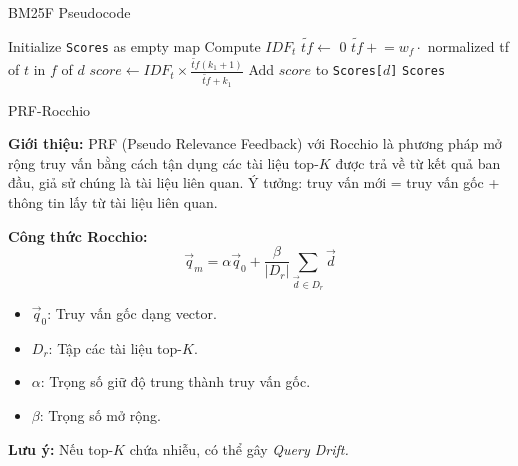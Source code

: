 \documentclass[10pt,aspectratio=169]{beamer}
\begin{document}
\begin{frame}{BM25F Pseudocode}
\scriptsize
\begin{tcolorbox}[colback=lightblue,colframe=ptitblue,boxrule=0.4pt,title=BM25F Algorithm (Pseudocode)]
\vspace{-1em}
\begin{algorithm}[H]
\begin{algorithmic}[1]
\State Initialize \texttt{Scores} as empty map
        \State Compute $IDF_t$
            \State $\tilde{tf} \leftarrow$ 0
                \State $\tilde{tf} \mathrel{+}= w_f \cdot$ normalized tf of $t$ in $f$ of $d$
            \EndFor
            \State $score \leftarrow IDF_t \times \frac{\tilde{tf} (k_1+1)}{\tilde{tf} + k_1}$
            \State Add $score$ to \texttt{Scores[$d$]}
        \EndFor
    \EndIf
\EndFor
\State \Return \texttt{Scores}
\end{algorithmic}
\end{algorithm}
\end{tcolorbox}
\normalsize
\end{frame}

\begin{frame}{PRF-Rocchio}
\begin{tcolorbox}[colback=lightblue,boxrule=0pt]
\textbf{Giới thiệu:}
PRF (Pseudo Relevance Feedback) với Rocchio là phương pháp mở rộng truy vấn bằng cách tận dụng các tài liệu top-$K$ được trả về từ kết quả ban đầu, giả sử chúng là tài liệu liên quan. Ý tưởng: truy vấn mới = truy vấn gốc + thông tin lấy từ tài liệu liên quan.
\end{tcolorbox}

\vspace{0.7em}
\textbf{Công thức Rocchio:}
\[
\vec{q}_m = \alpha\vec{q}_0 + \frac{\beta}{|D_r|}\sum_{\vec{d}\in D_r}\vec{d}
\]
\begin{itemize}
    \item $\vec{q}_0$: Truy vấn gốc dạng vector.
    \item $D_r$: Tập các tài liệu top-$K$.
    \item $\alpha$: Trọng số giữ độ trung thành truy vấn gốc.
    \item $\beta$: Trọng số mở rộng.
\end{itemize}
\vspace{0.3em}
\textbf{Lưu ý:} Nếu top-$K$ chứa nhiễu, có thể gây \textit{Query Drift.}
\end{frame}
\end{document}
